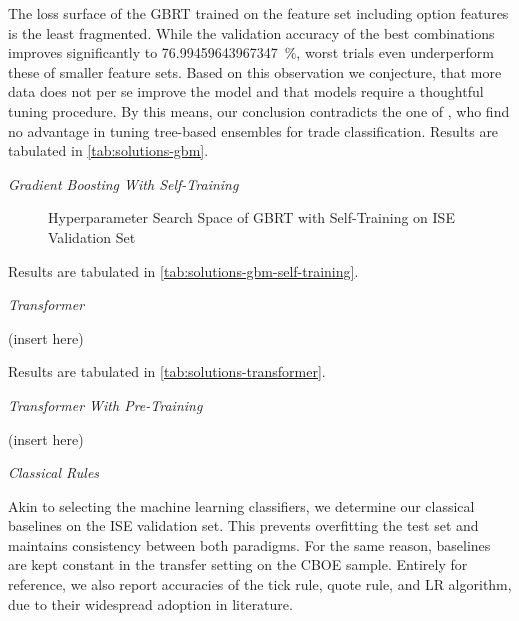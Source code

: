 The loss surface of the \gls{GBRT} trained on the feature set including option features is the least fragmented. While the validation accuracy of the best combinations improves significantly to \SI{76.99459643967347}{\percent}, worst trials even underperform these of smaller feature sets. Based on this observation we conjecture, that more data does not per se improve the model and that models require a thoughtful tuning procedure. By this means, our conclusion contradicts the one of \textcite[][14]{ronenMachineLearningTrade2022}, who find no advantage in tuning tree-based ensembles for trade classification. Results are tabulated in \cref{tab:solutions-gbm}.

\clearpage

\emph{Gradient Boosting With Self-Training}

\begin{figure}[!b]
    \vfill
\end{figure}

\clearpage

\begin{figure}[ht]
    \addtocounter{figure}{-1}
    \caption[]{Hyperparameter Search Space of \gls{GBRT} with Self-Training on \gls{ISE} Validation Set}
    \label{fig:ise-gbm-self-training-hyperparam}
\end{figure}

Results are tabulated in \cref{tab:solutions-gbm-self-training}.

\emph{Transformer}

(insert here)

Results are tabulated in \cref{tab:solutions-transformer}.

\emph{Transformer With Pre-Training}

(insert here)

\emph{Classical Rules}

Akin to selecting the machine learning classifiers, we determine our classical baselines on the \gls{ISE} validation set. This prevents \gls{overfitting} the test set and maintains consistency between both paradigms. For the same reason, baselines are kept constant in the transfer setting on the \gls{CBOE} sample. Entirely for reference, we also report accuracies of the tick rule, quote rule, and \gls{LR} algorithm, due to their widespread adoption in literature.

